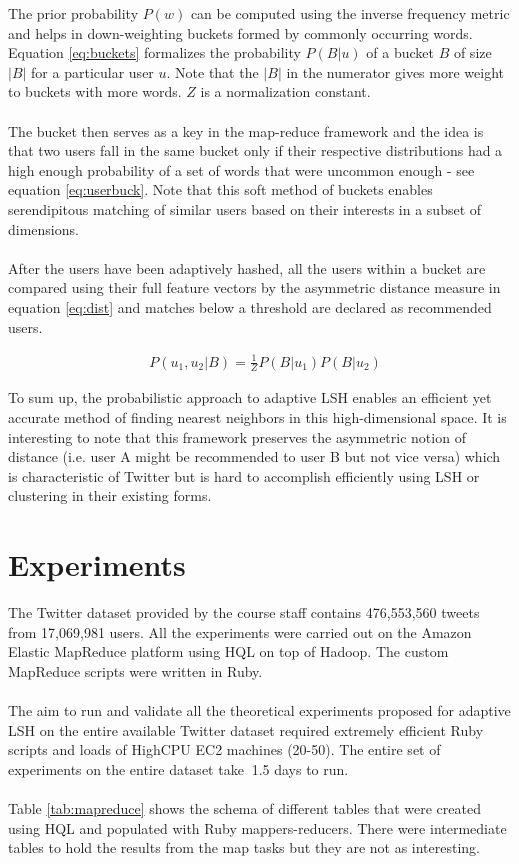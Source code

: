 \documentclass{article}
\begin{document}
The prior probability $P(w)$ can be computed using the inverse frequency metric and helps in
down-weighting buckets formed by commonly occurring words. Equation \ref{eq:buckets} formalizes
the probability $P(B|u)$ of a bucket $B$ of size $|B|$ for a particular user $u$. Note that
the $|B|$ in the numerator gives more weight to buckets with more words. $Z$ is a normalization constant.\\\\
The bucket then serves as a key in the map-reduce framework and the idea is that two users fall in
the same bucket only if their respective distributions had a high enough probability of a set 
of words that were uncommon enough - see equation \ref{eq:userbuck}. Note that this soft method of buckets enables serendipitous matching
of similar users based on their interests in a subset of dimensions.\\\\
After the users have been adaptively hashed, all the users within a bucket are compared using their full
feature vectors by the asymmetric distance measure in equation \ref{eq:dist} and matches below a threshold
are declared as recommended users. 

\begin{center}
\begin{align}
\label{eq:userbuck}
&P(u_1,u_2|B) = \frac{1}{Z}P(B|u_1)P(B|u_2)
\end{align}
\end{center}

To sum up, the probabilistic approach to adaptive LSH enables an efficient yet accurate 
method of finding nearest neighbors in this high-dimensional space. It is interesting to note
that this framework preserves the asymmetric notion of distance (i.e. user A might be recommended
to user B but not vice versa) which is characteristic of Twitter but is hard to accomplish
efficiently using LSH or clustering in their existing forms.

\section{Experiments}

The Twitter dataset provided by the course staff contains 
476,553,560 tweets from 17,069,981 users. All the experiments were carried out
on the Amazon Elastic MapReduce platform using HQL on top of Hadoop. The custom
MapReduce scripts were written in Ruby.\\\\
The aim to run and validate all the theoretical experiments proposed for adaptive
LSH on the entire available Twitter dataset required extremely efficient Ruby
scripts and loads of HighCPU EC2 machines (20-50). The entire set of experiments
on the entire dataset take $~$1.5 days to run.\\\\
Table \ref{tab:mapreduce} shows the schema of different tables that were created
using HQL and populated with Ruby mappers-reducers. There were intermediate tables to hold
the results from the map tasks but they are not as interesting.
\end{document}
